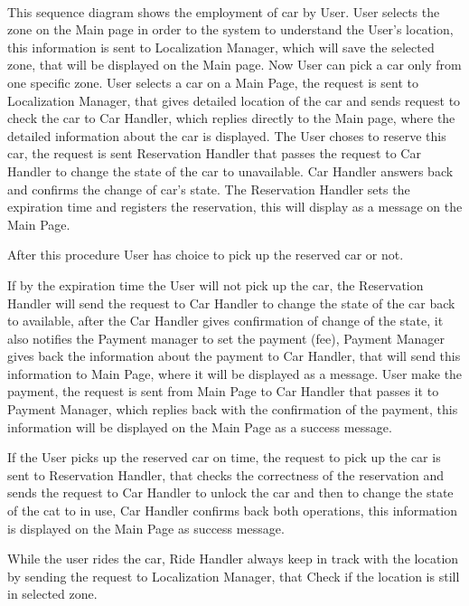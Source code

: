 		\paragraph{} This sequence diagram shows the employment of car by User.
		User selects the zone on the Main page in order to the system to understand the User's location, this information is sent to Localization Manager, which will save the selected zone, that will be displayed on the Main page. Now User can pick a car only from one specific zone. User selects a car on a Main Page, the request is sent to Localization Manager, that gives detailed location of the car and sends request to check the car to Car Handler, which replies directly to the Main page, where the detailed information about the car is displayed. The User choses to reserve this car, the request is sent Reservation Handler that passes the request to Car Handler to change the state of the car to unavailable. Car Handler answers back and confirms the change of car's state. The Reservation Handler sets the expiration time and registers the reservation, this will display as a message on the Main Page. 
		
		After this procedure User has choice to pick up the reserved car or not.
		
		If by the expiration time the User will not pick up the car, the  Reservation Handler will send the request to Car Handler to change the state of the car back to available, after the Car Handler gives confirmation of change of the state, it also notifies the Payment manager to set the payment (fee), Payment Manager gives back the information about the payment to Car Handler, that will send this information to Main Page, where it will be displayed as a message. User make the payment, the request is sent from Main Page to Car Handler that passes it to Payment Manager, which replies back with the confirmation of  the payment, this information will be displayed on the Main Page as a success message.   
		
		If the User picks up the reserved car on time, the request to pick up the car is sent to Reservation Handler, that checks the correctness of the reservation and sends the request to Car Handler to unlock the car and then to change the state of the cat to in use, Car Handler confirms back both operations, this information is displayed on the Main Page as success message.
		
		While the user rides the car, Ride Handler always keep in track with the location by sending the request to Localization Manager, that Check if the location is still in selected zone. 
		
